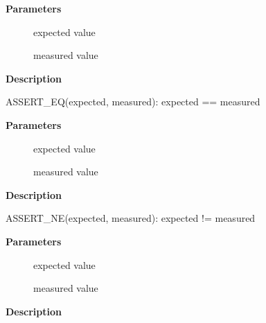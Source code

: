 \documentclass[a4paper,8pt,english]{sphinxmanual}
\begin{document}
\begin{fulllineitems}
\label{dev-tools/kselftest:c.ASSERT_EQ}
\end{fulllineitems}


\textbf{Parameters}
\begin{description}
\item[{}] \leavevmode
expected value

\item[{}] \leavevmode
measured value

\end{description}

\textbf{Description}

ASSERT\_EQ(expected, measured): expected == measured

\begin{fulllineitems}
\label{dev-tools/kselftest:c.ASSERT_NE}
\end{fulllineitems}


\textbf{Parameters}
\begin{description}
\item[{}] \leavevmode
expected value

\item[{}] \leavevmode
measured value

\end{description}

\textbf{Description}

ASSERT\_NE(expected, measured): expected != measured

\begin{fulllineitems}
\label{dev-tools/kselftest:c.ASSERT_LT}
\end{fulllineitems}


\textbf{Parameters}
\begin{description}
\item[{}] \leavevmode
expected value

\item[{}] \leavevmode
measured value

\end{description}

\textbf{Description}
\end{document}
